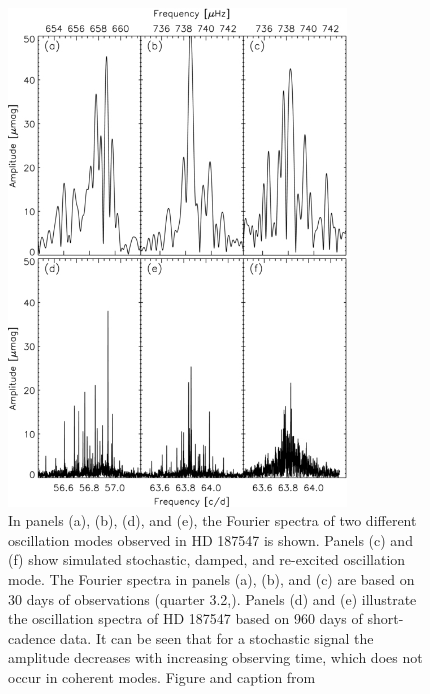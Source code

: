 \begin{figure}[htbp]
    \centering
    \includegraphics[width=0.8\textwidth]{superstar2.jpg}
    \caption{In panels (a), (b), (d), and (e), the Fourier spectra of two different oscillation modes observed in HD 187547 is shown. Panels (c) and (f) show simulated stochastic, damped, and re-excited oscillation mode. The Fourier spectra in panels (a), (b), and (c) are based on 30 days of observations (quarter 3.2,\citep{antoci2011solar}). Panels (d) and (e) illustrate the oscillation spectra of HD 187547 based on 960 days of short-cadence data. It can be seen that for a stochastic signal the amplitude decreases with increasing observing time, which does not occur in coherent modes. Figure and caption from \citet{antoci2014role}}
    \label{ss2}
\end{figure}


